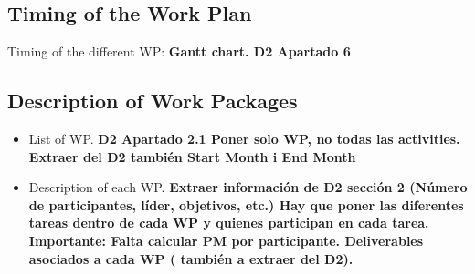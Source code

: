 \subsection{Timing of the Work Plan}

Timing of the different WP: \textbf{Gantt chart. D2 Apartado 6}

\subsection{Description of Work Packages}

\begin{itemize}

\item List of WP. \textbf{D2 Apartado 2.1 Poner solo WP, no todas las activities. Extraer del D2 también Start Month i End Month}

\item Description of each WP. \textbf{Extraer información de D2 sección 2 (Número de participantes, líder, objetivos, etc.) Hay que poner las diferentes tareas dentro de cada WP y quienes participan en cada tarea. Importante: Falta calcular PM por participante. Deliverables asociados a cada WP ( también a extraer del D2).}

\end{itemize}

